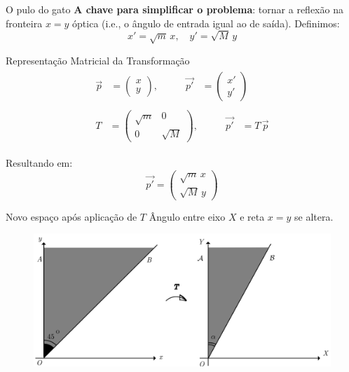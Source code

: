 \documentclass{beamer}
\begin{document}
\begin{frame}{O pulo do gato}
  \textbf{A chave para simplificar o problema}: tornar a reflexão na fronteira $x=y$ óptica (i.e., o ângulo de entrada igual ao de saída). Definimos:
  \begin{equation*}
    x' = \sqrt{m}\,x,\quad y' = \sqrt{M}\,y
  \end{equation*}
\end{frame}

\begin{frame}{Representação Matricial da Transformação}
  \begin{gather*}
    \begin{alignedat}{2}
      \vec{p} &= \begin{pmatrix} x \\ y \end{pmatrix}, &\qquad \vec{p'} &= \begin{pmatrix} x' \\ y' \end{pmatrix}
    \end{alignedat}
    \\[2ex] %
    \begin{alignedat}{2}
      T &= \begin{pmatrix} \sqrt{m} & 0 \\ 0 & \sqrt{M} \end{pmatrix}, &\qquad \vec{p'} &= T\,\vec{p}
    \end{alignedat}
  \end{gather*}

  Resultando em:
  \begin{equation*}
    \vec{p'}=\begin{pmatrix}\sqrt m\,x\\\sqrt M\,y\end{pmatrix}
  \end{equation*}
\end{frame}

\begin{frame}{Novo espaço após aplicação de $T$}
  Ângulo entre eixo $X$ e reta $x=y$ se altera.
  \begin{figure}
    \centering
    \includegraphics[width=1\textwidth]{images/image-3.png}
  \end{figure}
\end{frame}
\end{document}

